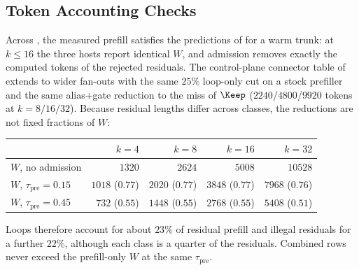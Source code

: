 \subsection{Token Accounting Checks}
\label{sec:ablate-idents}

Across , the measured prefill satisfies the predictions of  for a warm trunk:
at $k\le16$ the three hosts report identical $W$, and admission removes exactly the computed tokens of the rejected residuals.
The control-plane connector table of  extends to wider fan-outs with the same $25\%$ loop-only cut on a stock prefiller and the same alias$+$gate reduction to the miss of $\Keep$ ($2240$/$4800$/$9920$ tokens at $k{=}8/16/32$).
Because residual lengths differ across classes, the reductions are not fixed fractions of $W$:
\begin{center}
\scriptsize
\begin{tabular}{@{}lrrrr@{}}
\toprule
 & $k{=}4$ & $k{=}8$ & $k{=}16$ & $k{=}32$ \\
\midrule
$W$, no admission & $1320$ & $2624$ & $5008$ & $10528$ \\
$W$, $\tau_{\mathrm{pre}}{=}0.15$ & $1018$ ($0.77$) & $2020$ ($0.77$) & $3848$ ($0.77$) & $7968$ ($0.76$) \\
$W$, $\tau_{\mathrm{pre}}{=}0.45$ & $732$ ($0.55$) & $1448$ ($0.55$) & $2768$ ($0.55$) & $5408$ ($0.51$) \\
\bottomrule
\end{tabular}
\end{center}
Loops therefore account for about $23\%$ of residual prefill and illegal residuals for a further $22\%$, although each class is a quarter of the residuals.
Combined rows never exceed the prefill-only $W$ at the same $\tau_{\mathrm{pre}}$.

